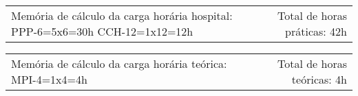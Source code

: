 {\fontsize{10pt}{12pt}\selectfont
\noindent
\begin{tabularx}{\linewidth}{@{}X r@{}}
Memória de cálculo da carga horária hospital:
PPP-6=5x6=30h
CCH-12=1x12=12h&
Total de horas práticas: 42h\\
\end{tabularx}
\noindent
\begin{tabularx}{\linewidth}{@{}X r@{}}
Memória de cálculo da carga horária teórica: 
MPI-4=1x4=4h &
Total de horas teóricas: 4h
\end{tabularx}
}